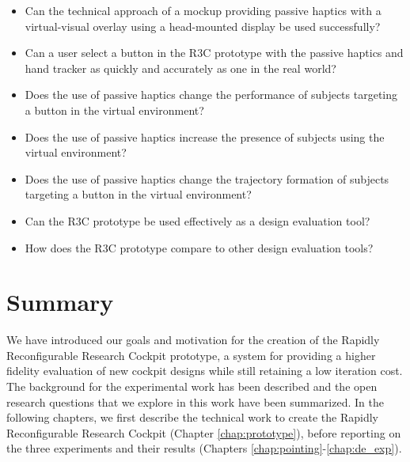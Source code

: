 \begin{itemize}
    \item Can the technical approach of a mockup providing passive haptics with a virtual-visual overlay using a head-mounted display be used successfully?
    \item Can a user select a button in the R3C prototype with the passive haptics and hand tracker as quickly and accurately as one in the real world?
    \item Does the use of passive haptics change the performance of subjects targeting a button in the virtual environment?
    \item Does the use of passive haptics increase the presence of subjects using the virtual environment?
    \item Does the use of passive haptics change the trajectory formation of subjects targeting a button in the virtual environment?
    \item Can the R3C prototype be used effectively as a design evaluation tool?
    \item How does the R3C prototype compare to other design evaluation tools?
\end{itemize}

\section{Summary}

We have introduced our goals and motivation for the creation of the Rapidly Reconfigurable Research Cockpit prototype, a system for providing a higher fidelity evaluation of new cockpit designs while still retaining a low iteration cost.
The background for the experimental work has been described and the open research questions that we explore in this work have been summarized.
In the following chapters, we first describe the technical work to create the Rapidly Reconfigurable Research Cockpit (Chapter \ref{chap:prototype}), before reporting on the three experiments and their results (Chapters \ref{chap:pointing}-\ref{chap:de_exp}).
